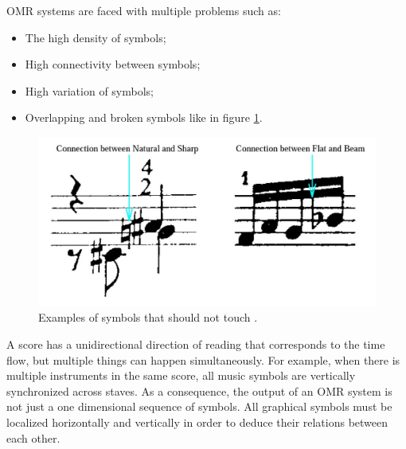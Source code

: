 \documentclass[11pt]{sdm}
\begin{document}
OMR systems are faced with multiple problems such as:
\begin{itemize}
  \item The high density of symbols;
  \item High connectivity between symbols;
  \item High variation of symbols;
  \item Overlapping and broken symbols like in figure \ref{connected_symbol}.
\end{itemize}
\begin{figure}[btp]
  \centering
  \includegraphics[scale=1]{img/connected_symbol}
  \caption{\label{connected_symbol} Examples of symbols that should not touch \cite{couasnon_using_1995}. }
\end{figure}
A score has a unidirectional direction of reading that corresponds to the time flow, but multiple things can happen simultaneously.
For example, when there is multiple instruments in the same score, all music symbols are vertically synchronized across staves.%
As a consequence, the output of an OMR system is not just a one dimensional sequence of symbols.
All graphical symbols must be localized horizontally and vertically in order to deduce their relations between each other.
\end{document}
